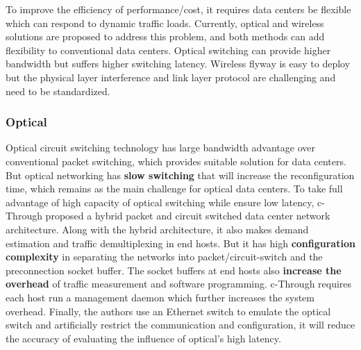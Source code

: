 \documentclass[journal,onecolumn,11pt]{IEEEtran}
\begin{document}
To improve the efficiency of performance/cost, it requires data centers be flexible which can respond to dynamic traffic loads. Currently, optical and wireless solutions are proposed to address this problem, and both methods can add flexibility to conventional data centers. Optical switching can provide higher bandwidth but suffers higher switching latency. Wireless flyway is easy to deploy but the physical layer interference and link layer protocol are challenging and need to be standardized.

\subsubsection{Optical}

Optical circuit switching technology has large bandwidth advantage over conventional packet switching, which provides suitable solution for data centers. But optical networking has \textbf{slow switching} that will increase the reconfiguration time, which remains as the main challenge for optical data centers. To take full advantage of high capacity of optical switching while ensure low latency, c-Through proposed a hybrid packet and circuit switched data center network architecture. Along with the hybrid architecture, it also makes demand estimation and traffic demultiplexing in end hosts. But it has high \textbf{configuration complexity} in separating the networks into packet/circuit-switch and the preconnection socket buffer. The socket buffers at end hosts also \textbf{increase the overhead} of traffic measurement and software programming. c-Through requires each host run a management daemon which further increases the system overhead. Finally, the authors use an Ethernet switch to emulate the optical switch and artificially restrict the communication and configuration, it will reduce the accuracy of evaluating the influence of optical's high latency.

\end{document}
